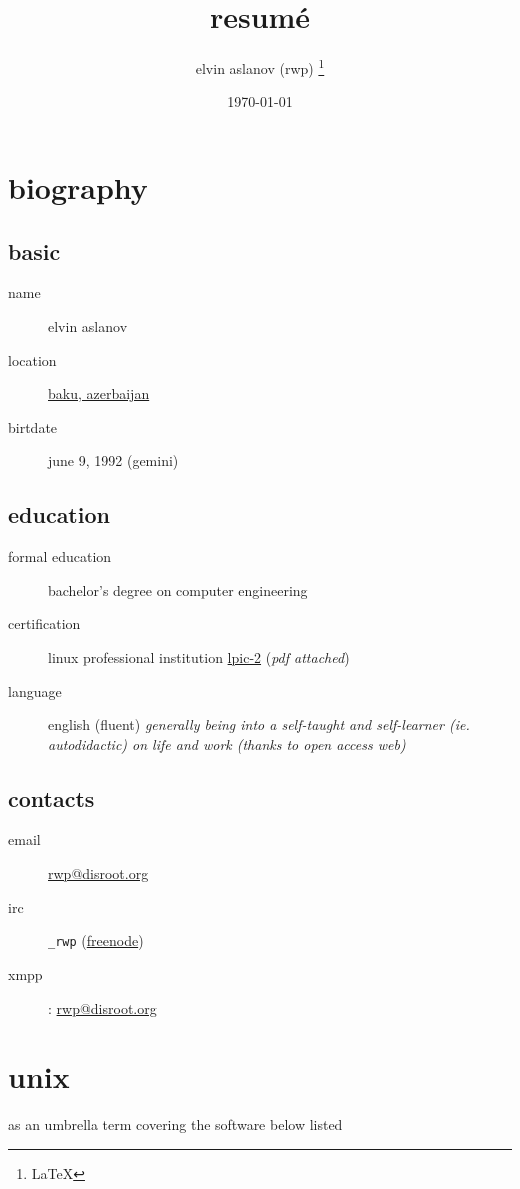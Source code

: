 \documentclass{article}
\title{resumé}
\author{elvin aslanov (rwp) \thanks{\LaTeX}}
\date{\today}
\begin{document}
\begin{titlepage}
\maketitle
\end{titlepage}
\section{biography}
\subsection{basic}
\begin{description}
\item[name] elvin aslanov
\item[location] \href{https://www.openstreetmap.org/relation/2415335}{baku, azerbaijan}
\item[birtdate] june 9, 1992 (gemini)
\end{description}
\subsection{education}
\begin{description}
\item[formal education] bachelor's degree on computer engineering
\item[certification] linux professional institution \href{https://cs.lpi.org/caf/Xamman/certification/verify/LPI000307519/bafrejwgeb}{lpic-2} (\textit{pdf attached})
\item[language] english (fluent)
\textit{generally being into a self-taught and self-learner (ie. autodidactic) on life and work (thanks to open access web)}
\end{description}
\subsection{contacts}
\begin{description}
\item[email] \href{mailto:rwp@disroot.org}{rwp@disroot.org}
\item[irc] \verb|_rwp| (\href{https://freenode.net/}{freenode})
\item[xmpp]: \url{rwp@disroot.org}
\end{description}
\section{unix} %
as an umbrella term covering the software below listed
\end{document}
